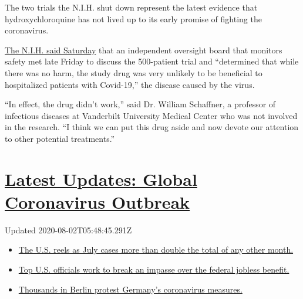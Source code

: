 The two trials the N.I.H. shut down represent the latest evidence that
hydroxychloroquine has not lived up to its early promise of fighting the
coronavirus.

\href{https://www.nih.gov/news-events/news-releases/nih-halts-clinical-trial-hydroxychloroquine}{The
N.I.H. said Saturday} that an independent oversight board that monitors
safety met late Friday to discuss the 500-patient trial and ``determined
that while there was no harm, the study drug was very unlikely to be
beneficial to hospitalized patients with Covid-19,'' the disease caused
by the virus.

``In effect, the drug didn't work,'' said Dr. William Schaffner, a
professor of infectious diseases at Vanderbilt University Medical Center
who was not involved in the research. ``I think we can put this drug
aside and now devote our attention to other potential treatments.''

\hypertarget{latest-updates-global-coronavirus-outbreak}{%
\section{\texorpdfstring{\href{https://www.nytimes.com/2020/08/01/world/coronavirus-covid-19.html?action=click\&pgtype=Article\&state=default\&region=MAIN_CONTENT_1\&context=storylines_live_updates}{Latest
Updates: Global Coronavirus
Outbreak}}{Latest Updates: Global Coronavirus Outbreak}}\label{latest-updates-global-coronavirus-outbreak}}

Updated 2020-08-02T05:48:45.291Z

\begin{itemize}
\tightlist
\item
  \href{https://www.nytimes.com/2020/08/01/world/coronavirus-covid-19.html?action=click\&pgtype=Article\&state=default\&region=MAIN_CONTENT_1\&context=storylines_live_updates\#link-34047410}{The
  U.S. reels as July cases more than double the total of any other
  month.}
\item
  \href{https://www.nytimes.com/2020/08/01/world/coronavirus-covid-19.html?action=click\&pgtype=Article\&state=default\&region=MAIN_CONTENT_1\&context=storylines_live_updates\#link-780ec966}{Top
  U.S. officials work to break an impasse over the federal jobless
  benefit.}
\item
  \href{https://www.nytimes.com/2020/08/01/world/coronavirus-covid-19.html?action=click\&pgtype=Article\&state=default\&region=MAIN_CONTENT_1\&context=storylines_live_updates\#link-25930521}{Thousands
  in Berlin protest Germany's coronavirus measures.}
\end{itemize}

